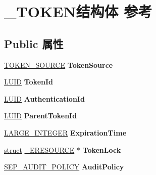 \hypertarget{struct___t_o_k_e_n}{}\section{\+\_\+\+T\+O\+K\+E\+N结构体 参考}
\label{struct___t_o_k_e_n}
\subsection*{Public 属性}
\begin{DoxyCompactItemize}
\item 
\mbox{\label{struct___t_o_k_e_n_ae36b738fc758e9a5c57f1072fdb18829}} 
\hyperlink{struct___t_o_k_e_n___s_o_u_r_c_e}{T\+O\+K\+E\+N\+\_\+\+S\+O\+U\+R\+CE} {\bfseries Token\+Source}
\item 
\mbox{\label{struct___t_o_k_e_n_ab3076fedd5fb8bc649da99393d8a8e41}} 
\hyperlink{struct___l_u_i_d}{L\+U\+ID} {\bfseries Token\+Id}
\item 
\mbox{\label{struct___t_o_k_e_n_a05b61010c296c1e1a10c68cf72bad38a}} 
\hyperlink{struct___l_u_i_d}{L\+U\+ID} {\bfseries Authentication\+Id}
\item 
\mbox{\label{struct___t_o_k_e_n_a7a51aa455970fac9e3b56a9d48f2e3bc}} 
\hyperlink{struct___l_u_i_d}{L\+U\+ID} {\bfseries Parent\+Token\+Id}
\item 
\mbox{\label{struct___t_o_k_e_n_a29584b35b4d750d773614b8d27c1b8a8}} 
\hyperlink{union___l_a_r_g_e___i_n_t_e_g_e_r}{L\+A\+R\+G\+E\+\_\+\+I\+N\+T\+E\+G\+ER} {\bfseries Expiration\+Time}
\item 
\mbox{\label{struct___t_o_k_e_n_a96567599435486e59a3f4a5b55b6daa3}} 
\hyperlink{interfacestruct}{struct} \hyperlink{struct___e_r_e_s_o_u_r_c_e}{\+\_\+\+E\+R\+E\+S\+O\+U\+R\+CE} $\ast$ {\bfseries Token\+Lock}
\item 
\mbox{\label{struct___t_o_k_e_n_a49758c0e18db6577918d764f6e40f4c7}} 
\hyperlink{struct___s_e_p___a_u_d_i_t___p_o_l_i_c_y}{S\+E\+P\+\_\+\+A\+U\+D\+I\+T\+\_\+\+P\+O\+L\+I\+CY} {\bfseries Audit\+Policy}
\item 
\mbox{\label{struct___t_o_k_e_n_a1c446cddd6245cbebeabfb4d585a8d07}} 

\end{DoxyCompactItemize}
